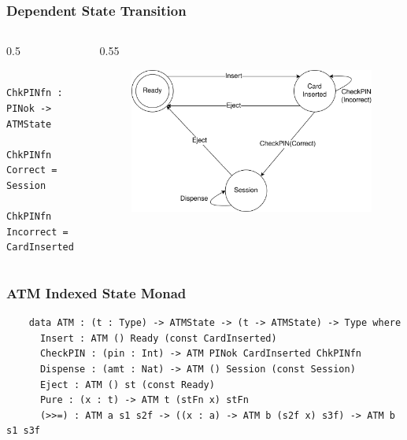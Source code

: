 \documentclass[compress,handout]{beamer}
\begin{document}
\begin{frame}[fragile]
  \frametitle{Dependent State Transition}

  \begin{columns}
  \begin{column}{0.5\framewidth}
    \begin{verbatim}
      ChkPINfn : PINok -> ATMState
      ChkPINfn Correct = Session
      ChkPINfn Incorrect = CardInserted
    \end{verbatim}
  \end{column}
  \hspace*{-7mm}
  \begin{column}{0.55\framewidth}
    \begin{figure}
    \includegraphics[alt={The state diagram from slide 7.},width=\textwidth]{ATM.png}
    \end{figure}
  \end{column}
  \end{columns}

\end{frame}

\begin{frame}[fragile]
  \frametitle{ATM Indexed State Monad}

  \begin{verbatim}
    data ATM : (t : Type) -> ATMState -> (t -> ATMState) -> Type where
      Insert : ATM () Ready (const CardInserted)
      CheckPIN : (pin : Int) -> ATM PINok CardInserted ChkPINfn
      Dispense : (amt : Nat) -> ATM () Session (const Session)
      Eject : ATM () st (const Ready)
      Pure : (x : t) -> ATM t (stFn x) stFn
      (>>=) : ATM a s1 s2f -> ((x : a) -> ATM b (s2f x) s3f) -> ATM b s1 s3f
  \end{verbatim}
\end{frame}
\end{document}
